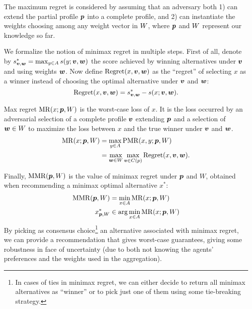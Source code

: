 The maximum regret is considered by assuming that an adversary both 1) can extend the partial profile ${\bm{p}}$ into a complete profile, and 2) can instantiate the weights choosing among any weight vector in $W$, where ${\bm{p}}$ and $W$ represent our knowledge so far.

We formalize the notion of minimax regret in multiple steps.
First of all, denote by $s^*_{\bm{v}, \bm{w}} = \max_{y \in A} s(y; \bm{v}, \bm{w})$ the score achieved by winning alternatives under $\bm{v}$ and using weights $\bm{w}$. Now define $\operatorname{Regret}(x, \bm{v}, \bm{w})$ as the “regret” of selecting $x$ as a winner instead of choosing the optimal alternative under $\bm{v}$ and $\bm{w}$:
\[\operatorname{Regret}(x, \bm{v}, \bm{w}) = s^*_{\bm{v}, \bm{w}} - s(x; \bm{v}, \bm{w}).\]


Max regret $\operatorname{MR}(x;{\bm{p}},W)$ is the worst-case loss of $x$. It is the loss occurred by an adversarial selection of a complete profile $\bm{v}$ extending ${\bm{p}}$ and a selection of $\bm{w} \in W$ to maximize the loss between $x$ and the true winner under $\bm{v}$ and $\bm{w}$.
\begin{align}
\operatorname{MR}(x; {\bm{p}}, W) & = \max_{y \in A} \operatorname{PMR}(x,y; {\bm{p}}, W)\\
& = \max_{\bm{w} \in W} \max_{\bm{v} \in C(p)} \operatorname{Regret}(x, \bm{v}, \bm{w}).
\end{align}

Finally,  $\operatorname{MMR}({\bm{p}},W)$ is the value of minimax regret under ${\bm{p}}$ and $W$, obtained when recommending a minimax optimal alternative $x^*$:
\begin{align*}
\operatorname{MMR}({\bm{p}},W) & = \min_{x \in A} \operatorname{MR}(x;{\bm{p}},W) \\
x^{*}_{{\bm{p}},W} & \in \arg\min_{x \in A} \operatorname{MR}(x;{\bm{p}},W) 
\end{align*}
By picking as consensus choice\footnote{In cases of ties in minimax regret, we can either decide to return all minimax alternatives as ``winner'' or to pick just one of them using some tie-breaking strategy.} an alternative associated with minimax regret, we can provide a recommendation that gives worst-case guarantees, giving some robustness in face of uncertainty (due to both not knowing the agents' preferences and the weights used in the aggregation). 

